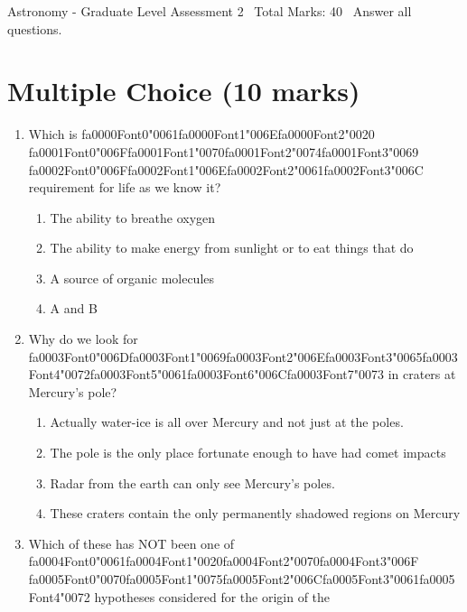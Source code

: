 \documentclass[12pt]{article}
\begin{document}
\begin{center}
Astronomy - Graduate Level Assessment 2 \
Total Marks: 40 \
Answer all questions.
\end{center}

\section*{Multiple Choice (10 marks)}
\begin{enumerate}[label=\arabic*.]
\item Which is {\csname fa0000Font0\endcsname\char"0061}{\csname fa0000Font1\endcsname\char"006E}{\csname fa0000Font2\endcsname\char"0020} {\csname fa0001Font0\endcsname\char"006F}{\csname fa0001Font1\endcsname\char"0070}{\csname fa0001Font2\endcsname\char"0074}{\csname fa0001Font3\endcsname\char"0069} {\csname fa0002Font0\endcsname\char"006F}{\csname fa0002Font1\endcsname\char"006E}{\csname fa0002Font2\endcsname\char"0061}{\csname fa0002Font3\endcsname\char"006C} requirement for life as we know it?
\begin{enumerate}[label=(\alph*)]
    \item The ability to breathe oxygen
    \item The ability to make energy from sunlight or to eat things that do
    \item A source of organic molecules
    \item A and B
\end{enumerate}
\item Why do we look for {\csname fa0003Font0\endcsname\char"006D}{\csname fa0003Font1\endcsname\char"0069}{\csname fa0003Font2\endcsname\char"006E}{\csname fa0003Font3\endcsname\char"0065}{\csname fa0003Font4\endcsname\char"0072}{\csname fa0003Font5\endcsname\char"0061}{\csname fa0003Font6\endcsname\char"006C}{\csname fa0003Font7\endcsname\char"0073} in craters at Mercury's pole?
\begin{enumerate}[label=(\alph*)]
    \item Actually water-ice is all over Mercury and not just at the poles.
    \item The pole is the only place fortunate enough to have had comet impacts
    \item Radar from the earth can only see Mercury's poles.
    \item These craters contain the only permanently shadowed regions on Mercury
\end{enumerate}
\item Which of these has NOT been one of {\csname fa0004Font0\endcsname\char"0061}{\csname fa0004Font1\endcsname\char"0020}{\csname fa0004Font2\endcsname\char"0070}{\csname fa0004Font3\endcsname\char"006F} {\csname fa0005Font0\endcsname\char"0070}{\csname fa0005Font1\endcsname\char"0075}{\csname fa0005Font2\endcsname\char"006C}{\csname fa0005Font3\endcsname\char"0061}{\csname fa0005Font4\endcsname\char"0072} hypotheses considered for the origin of the

\end{enumerate}
\end{document}
